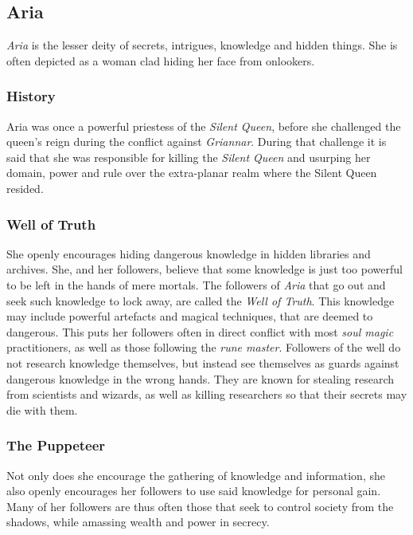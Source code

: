 \subsection{Aria}
\label{sec:Aria}


\emph{Aria} is the lesser deity of secrets, intrigues, knowledge and hidden
things. She is often depicted as a woman clad hiding her face from onlookers.

\subsubsection*{History}

Aria was once a powerful priestess of the \emph{Silent Queen}, before she
challenged the queen's reign during the conflict against \emph{Griannar}.
During that challenge it is said that she was responsible for killing the
\emph{Silent Queen} and usurping her domain, power and rule over the
extra-planar realm where the Silent Queen resided.

\subsubsection*{Well of Truth}
\label{sec:Well of Truth}

She openly encourages hiding dangerous knowledge in hidden libraries and
archives. She, and her followers, believe that some knowledge is just too
powerful to be left in the hands of mere mortals. The followers of \emph{Aria}
that go out and seek such knowledge to lock away, are called the \emph{Well of
  Truth}. This knowledge may include powerful artefacts and magical
techniques, that are deemed to dangerous. This puts her followers often in
direct conflict with most \emph{soul magic} practitioners, as well as those
following the \emph{rune master}. Followers of the well do not research
knowledge themselves, but instead see themselves as guards against dangerous
knowledge in the wrong hands. They are known for stealing research from
scientists and wizards, as well as killing researchers so that their secrets
may die with them.

\subsubsection*{The Puppeteer}

Not only does she encourage the gathering of knowledge and information, she
also openly encourages her followers to use said knowledge for personal gain.
Many of her followers are thus often those that seek to control society from
the shadows, while amassing wealth and power in secrecy.

